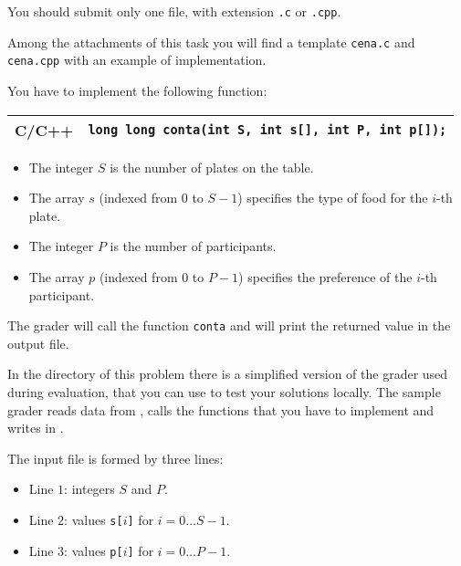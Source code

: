 
\Implementation

You should submit only one file, with extension \texttt{.c} or \texttt{.cpp}.

\begin{warning}
  Among the attachments of this task you will find a template \texttt{cena.c}
  and \texttt{cena.cpp} with an example of implementation.
\end{warning}

You have to implement the following function:

\begin{center}\begin{tabularx}{\textwidth}{|c|X|}
\hline
C/C++  & \verb|long long conta(int S, int s[], int P, int p[]);|\\
\hline
\end{tabularx}\end{center}

\begin{itemize}[nolistsep]
  \item The integer $S$ is the number of plates on the table.
  \item The array $s$ (indexed from $0$ to $S-1$) specifies the type of food for the $i$-th plate.
  \item The integer $P$ is the number of participants.
  \item The array $p$ (indexed from $0$ to $P-1$) specifies the preference of the $i$-th participant.
\end{itemize}

The grader will call the function \texttt{conta} and will print the returned
value in the output file.



\Grader
In the directory of this problem there is a simplified version of the grader
used during evaluation, that you can use to test your solutions locally. The
sample grader reads data from , calls the functions that you have to
implement and writes in \outputfile{}.

The input file is formed by three lines:
\begin{itemize}[nolistsep,itemsep=2mm]
\item Line $1$: integers $S$ and $P$.
\item Line $2$: values \texttt{s[$i$]} for $i = 0\ldots S-1$.
\item Line $3$: values \texttt{p[$i$]} for $i = 0\ldots P-1$.
\end{itemize}

